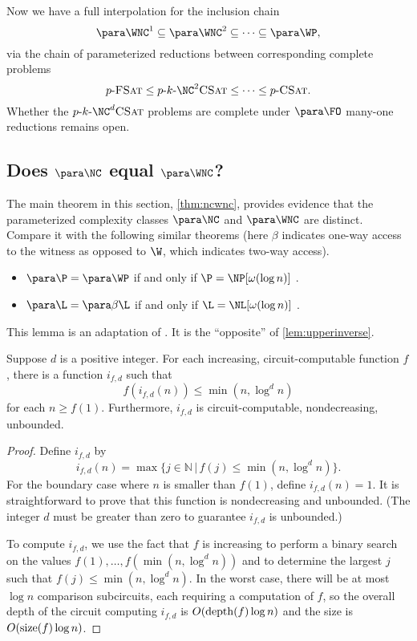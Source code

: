 Now we have a full interpolation for the inclusion chain
\[
\para \WNC^1 \subseteq \para \WNC^2 \subseteq \dotsb \subseteq \para \WP,
\]
via the chain of parameterized reductions between corresponding complete problems
\[
\pFSAT \leq p \dash k \dash \NC^2 \textsc{CSat} \leq \dotsb \leq p \dash \textsc{CSat}.
\]
Whether the $\pNCSAT$ problems are complete under $\para \FO$ many-one reductions remains open.

\subsection{Does \texorpdfstring{$\para \NC$}{paraNC} equal \texorpdfstring{$\para \WNC$}{paraWNC}?}
\label{sec:fppwpp}

The main theorem in this section, \autoref{thm:ncwnc}, provides evidence that the parameterized complexity classes $\para \NC$ and $\para \WNC$ are distinct.
Compare it with the following similar theorems (here $\beta$ indicates one-way access to the witness as opposed to $\W$, which indicates two-way access).
\begin{itemize}
\item $\para \P = \para \WP$ if and only if $\P = \NP[\omega(\log n)]$ \autocite[Theorem~3.29]{fg06}.
\item $\para \L = \para \beta \L$ if and only if $\L = \NL[\omega(\log n)]$ \autocite[Theorem~15]{cm14}.
\end{itemize}

This lemma is an adaptation of \autocite[Lemma~3.24]{fg06}.
It is the ``opposite'' of \autoref{lem:upperinverse}.

\begin{lemma}\label{lem:lowerinverse}
  Suppose $d$ is a positive integer.
  For each increasing, circuit-computable function $f$, there is a function $i_{f, d}$ such that
  \[
  f(i_{f, d}(n)) \leq \min(n, \log^d n)
  \]
  for each $n \geq f(1)$.
  Furthermore, $i_{f, d}$ is circuit-computable, nondecreasing, unbounded.
\end{lemma}
\begin{proof}
  Define $i_{f, d}$ by
  \[
  i_{f, d}(n) = \max\{ j \in \mathbb{N} \, | \, f(j) \leq \min(n, \log^d n) \}.
  \]
  For the boundary case where $n$ is smaller than $f(1)$, define $i_{f, d}(n) = 1$.
  It is straightforward to prove that this function is nondecreasing and unbounded.
  (The integer $d$ must be greater than zero to guarantee $i_{f, d}$ is unbounded.)

  To compute $i_{f, d}$, we use the fact that $f$ is increasing to perform a binary search on the values $f(1), \dotsc, f(\min(n, \log^d n))$ and to determine the largest $j$ such that $f(j) \leq \min(n, \log^d n)$.
  In the worst case, there will be at most $\log n$ comparison subcircuits, each requiring a computation of $f$, so the overall depth of the circuit computing $i_{f, d}$ is $O(\operatorname{depth}(f) \log n)$ and the size is $O(\operatorname{size}(f) \log n)$.
\end{proof}

